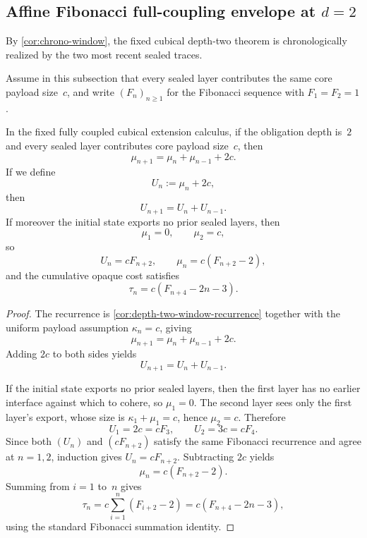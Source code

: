 \documentclass{lmcs}
\begin{document}
\subsection{\texorpdfstring{Affine Fibonacci full-coupling envelope at $d=2$}{Affine Fibonacci full-coupling envelope at d=2}}

By \autoref{cor:chrono-window}, the fixed cubical depth-two theorem is chronologically realized by the two most recent sealed traces.

Assume in this subsection that every sealed layer contributes the same core payload size~$c$, and write $(F_n)_{n \geq 1}$ for the Fibonacci sequence with $F_1=F_2=1$.

\begin{cor}
\label{cor:fibonacci}
\label{cor:constant-payload-fibonacci}
In the fixed fully coupled cubical extension calculus, if the obligation depth is~$2$ and every sealed layer contributes core payload size~$c$, then
\[
  \mu_{n+1} = \mu_n + \mu_{n-1} + 2c.
\]
If we define
\[
  U_n := \mu_n + 2c,
\]
then
\[
  U_{n+1} = U_n + U_{n-1}.
\]
If moreover the initial state exports no prior sealed layers, then
\[
  \mu_1 = 0,
  \qquad
  \mu_2 = c,
\]
so
\[
  U_n = cF_{n+2},
  \qquad
  \mu_n = c(F_{n+2}-2),
\]
and the cumulative opaque cost satisfies
\[
  \tau_n = c(F_{n+4}-2n-3).
\]
\end{cor}

\begin{proof}
The recurrence is \autoref{cor:depth-two-window-recurrence} together with the uniform payload assumption $\kappa_n=c$, giving
\[
  \mu_{n+1} = \mu_n + \mu_{n-1} + 2c.
\]
Adding $2c$ to both sides yields
\[
  U_{n+1} = U_n + U_{n-1}.
\]

If the initial state exports no prior sealed layers, then the first layer has no earlier interface against which to cohere, so $\mu_1=0$. The second layer sees only the first layer's export, whose size is $\kappa_1+\mu_1=c$, hence $\mu_2=c$. Therefore
\[
  U_1 = 2c = cF_3,
  \qquad
  U_2 = 3c = cF_4.
\]
Since both $(U_n)$ and $(cF_{n+2})$ satisfy the same Fibonacci recurrence and agree at $n=1,2$, induction gives $U_n=cF_{n+2}$. Subtracting $2c$ yields
\[
  \mu_n = c(F_{n+2}-2).
\]
Summing from $i=1$ to~$n$ gives
\[
  \tau_n
  =
  c\sum_{i=1}^n (F_{i+2}-2)
  =
  c(F_{n+4}-2n-3),
\]
using the standard Fibonacci summation identity.
\end{proof}
\end{document}
